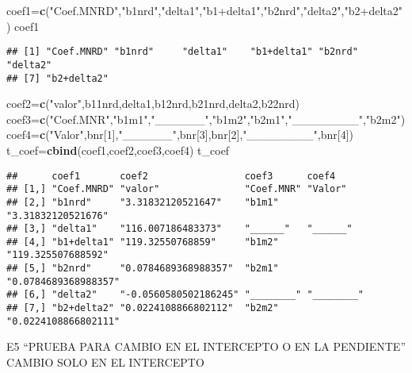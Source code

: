 \documentclass[
]{article}
\newenvironment{Shaded}{\begin{snugshade}}{\end{snugshade}}
\newcommand{\DecValTok}[1]{\textcolor[rgb]{0.00,0.00,0.81}{#1}}
\newcommand{\KeywordTok}[1]{\textcolor[rgb]{0.13,0.29,0.53}{\textbf{#1}}}
\newcommand{\NormalTok}[1]{#1}
\newcommand{\StringTok}[1]{\textcolor[rgb]{0.31,0.60,0.02}{#1}}
\begin{document}
\begin{Shaded}
\begin{Highlighting}[]
\NormalTok{coef1=}\KeywordTok{c}\NormalTok{(}\StringTok{"Coef.MNRD"}\NormalTok{,}\StringTok{"b1nrd"}\NormalTok{,}\StringTok{"delta1"}\NormalTok{,}\StringTok{"b1+delta1"}\NormalTok{,}\StringTok{"b2nrd"}\NormalTok{,}\StringTok{"delta2"}\NormalTok{,}\StringTok{"b2+delta2"}\NormalTok{)}
\NormalTok{coef1}
\end{Highlighting}
\end{Shaded}

\begin{verbatim}
## [1] "Coef.MNRD" "b1nrd"     "delta1"    "b1+delta1" "b2nrd"     "delta2"   
## [7] "b2+delta2"
\end{verbatim}

\begin{Shaded}
\begin{Highlighting}[]
\NormalTok{coef2=}\KeywordTok{c}\NormalTok{(}\StringTok{"valor"}\NormalTok{,b11nrd,delta1,b12nrd,b21nrd,delta2,b22nrd)}
\NormalTok{coef3=}\KeywordTok{c}\NormalTok{(}\StringTok{"Coef.MNR"}\NormalTok{,}\StringTok{"b1m1"}\NormalTok{,}\StringTok{"______"}\NormalTok{,}\StringTok{"b1m2"}\NormalTok{,}\StringTok{"b2m1"}\NormalTok{,}\StringTok{"________"}\NormalTok{,}\StringTok{"b2m2"}\NormalTok{)}
\NormalTok{coef4=}\KeywordTok{c}\NormalTok{(}\StringTok{"Valor"}\NormalTok{,bnr[}\DecValTok{1}\NormalTok{],}\StringTok{"______"}\NormalTok{,bnr[}\DecValTok{3}\NormalTok{],bnr[}\DecValTok{2}\NormalTok{],}\StringTok{"________"}\NormalTok{,bnr[}\DecValTok{4}\NormalTok{])}
\NormalTok{t_coef=}\KeywordTok{cbind}\NormalTok{(coef1,coef2,coef3,coef4)}
\NormalTok{t_coef}
\end{Highlighting}
\end{Shaded}

\begin{verbatim}
##      coef1       coef2                 coef3      coef4               
## [1,] "Coef.MNRD" "valor"               "Coef.MNR" "Valor"             
## [2,] "b1nrd"     "3.31832120521647"    "b1m1"     "3.31832120521676"  
## [3,] "delta1"    "116.007186483373"    "______"   "______"            
## [4,] "b1+delta1" "119.32550768859"     "b1m2"     "119.325507688592"  
## [5,] "b2nrd"     "0.0784689368988357"  "b2m1"     "0.0784689368988357"
## [6,] "delta2"    "-0.0560580502186245" "________" "________"          
## [7,] "b2+delta2" "0.0224108866802112"  "b2m2"     "0.0224108866802111"
\end{verbatim}

E5 ``PRUEBA PARA CAMBIO EN EL INTERCEPTO O EN LA PENDIENTE'' CAMBIO SOLO
EN EL INTERCEPTO
\end{document}
